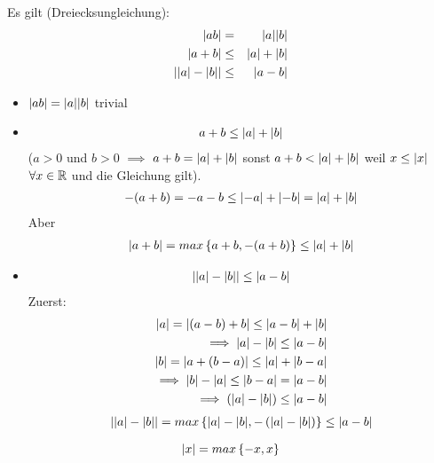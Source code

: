 \begin{Sat}
  Es gilt (Dreiecksungleichung):
  \begin{align*}
    \abs{ab}&=&\abs{a}\abs{b}\\
    \abs{a+b}&\leq&\abs{a}+\abs{b}\\
    \abs{\abs{a}-\abs{b}}&\leq&\abs{a-b}
  \end{align*}
\end{Sat}
\begin{Bew}
  \begin{itemize}
    \item $\abs{ab} = \abs{a}\abs{b}$ trivial
    \item 
      \begin{align*}
         a+b\leq \abs{a}+\abs{b} 
      \end{align*}
      ($a>0$ und $b>0$ $\implies$ $a+b=\abs{a}+\abs{b}$ sonst $a+b<\abs{a}+\abs{b}$ weil $x\leq\abs{x}$ $\forall x\in\mb{R}$ und die Gleichung gilt).
      \begin{align*}
        -(a+b)=-a-b\leq \abs{-a}+\abs{-b} = \abs{a}+\abs{b}
      \end{align*}
      Aber
      \begin{align*}
        \abs{a+b}=max\left\{ a+b, -(a+b) \right\}\leq \abs{a}+\abs{b}
      \end{align*}
    \item
      \begin{align*}
        \abs{\abs{a}-\abs{b}} \leq \abs{a-b}
      \end{align*}
      Zuerst:
      \begin{align*}
        \abs{a}=\abs{(a-b)+b}\leq \abs{a-b} + \abs{b} \\
        \implies \abs{a}-\abs{b}\leq \abs{a-b}\\
        \abs{b}=\abs{a+(b-a)}\leq \abs{a}+\abs{b-a}\\
        \implies \abs{b}-\abs{a}\leq \abs{b-a} = \abs{a-b} \\
        \implies \left( \abs{a}-\abs{b} \right)\leq \abs{a-b}\\
      \end{align*}
      \begin{align*}
        \abs{\abs{a}-\abs{b}}=max\left\{ \abs{a}-\abs{b}, -\left( \abs{a}-\abs{b} \right) \right\}\leq\abs{a-b}
      \end{align*}
  \end{itemize}
\end{Bew}
\begin{Bem}
  $$\abs{x}=max\left\{ -x,x \right\}$$
\end{Bem}
